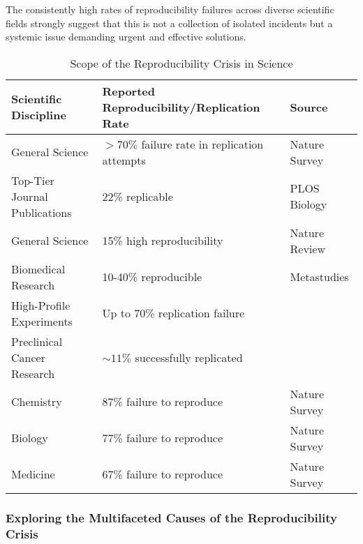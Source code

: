 \documentclass{article}
\begin{document}
The consistently high rates of reproducibility failures across diverse scientific fields strongly suggest that this is not a collection of isolated incidents but a systemic issue demanding urgent and effective solutions.


\begin{table}[h]
    \centering
    \caption{Scope of the Reproducibility Crisis in Science}
    \label{tab:reproducibility_scope}
    \begin{tabular}{|p{5cm}|p{4cm}|p{4cm}|}
        \hline
        \textbf{Scientific Discipline} & \textbf{Reported Reproducibility/Replication Rate} & \textbf{Source}                               \\
        \hline
        General Science                & $>70\%$ failure rate in replication attempts       & Nature Survey \cite{baker2016reproducibility} \\
        Top-Tier Journal Publications  & 22\% replicable                                    & PLOS Biology \cite{begley2012drug}            \\
        General Science                & 15\% high reproducibility                          & Nature Review \cite{baker2016reproducibility} \\
        Biomedical Research            & 10-40\% reproducible                               & Metastudies \cite{ioannidis2005most}          \\
        High-Profile Experiments       & Up to 70\% replication failure                     & \cite{begley2012drug}                         \\
        Preclinical Cancer Research    & $\sim11\%$ successfully replicated                 & \cite{prinz2011believe}                       \\
        Chemistry                      & 87\% failure to reproduce                          & Nature Survey \cite{baker2016reproducibility} \\
        Biology                        & 77\% failure to reproduce                          & Nature Survey \cite{baker2016reproducibility} \\
        Medicine                       & 67\% failure to reproduce                          & Nature Survey \cite{baker2016reproducibility} \\
        \hline
    \end{tabular}
\end{table}


\subsubsection{Exploring the Multifaceted Causes of the Reproducibility Crisis}
\end{document}
